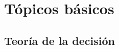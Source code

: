 \documentclass[10pt,openright]{book}\usepackage[]{graphicx}\usepackage[]{color}
\begin{document}

    
    
    \def\bPi{\mbox{\boldmath$\Pi$}}
    \def\bGamma{\mbox{\boldmath$\Gamma$}}
    \def\bgamma{\mbox{\boldmath$\gamma$}}
    \def\beps{\mbox{\boldmath$\varepsilon$}}
    \def\bbeta{\mbox{\boldmath$\beta$}}
    \def\bLambda{\mbox{\boldmath$\Lambda$}}
    \def\blambda{\mbox{\boldmath$\lambda$}}
    \def\bBeta{\mbox{\boldmath$\Beta$}}
    \def\bEta{\mbox{\boldmath$\eta$}}
    \def\balpha{\mbox{\boldmath$\alpha$}}
    \def\btheta{\mbox{\boldmath$\theta$}}
    \def\bmu{\mbox{\boldmath$\mu$}}
    \def\bSigma{\mbox{\boldmath$\Sigma$}}
    \def\bphi{\mbox{\boldmath$\phi$}}
    \def\bpi{\mbox{\boldmath$\pi$}}
    \def\bxi{\mbox{\boldmath$\xi$}}
    
    \theoremstyle{definition}
    \newtheorem{Eje}{Ejemplo}
    
    \theoremstyle{mydef}
    \newtheorem{Res}{Resultado}
    \newtheorem{Defi}{Definici\'on}
    \renewcommand{\tablename}{Tabla}
    \renewcommand{\listtablename}{\'Indice de Tablas}
    \renewcommand{\contentsname}{Contenido}
    \renewcommand{\proofname}{\bfseries \slshape Prueba}
    \renewcommand{\qedsymbol}{$\blacksquare$}
      
      \pagestyle{empty}
    \frontmatter
    \tableofcontents
      \mainmatter
   \pagestyle{fancy}


  
\chapter{Tópicos básicos}

\section{Teoría de la decisión}
\end{document}
